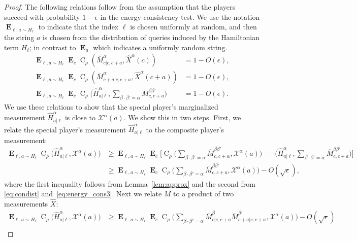 \documentclass[11pt,letterpaper]{article}
\newcommand{\<}{\langle}
\renewcommand{\>}{\rangle}
\newcommand{\myeqref}[1]{\eqref{eq:#1}}
\newcommand{\eps}{\epsilon}
\newcommand{\Xlin}{\mathcal{X}}
\DeclareMathOperator{\E}{\mathbf{E}}
\DeclareMathOperator{\CON}{C}
\DeclareMathOperator{\DIS}{d}
\DeclareMathOperator{\Drho}{\DIS_\rho}
\newcommand{\bavg}[2]{\big\langle #1 \big\rangle_{#2}}
\newcommand{\cons}{\ensuremath{\rm cons}}
\newcommand{\sx}{\hat{X}}
\renewcommand{\sp}{\hat{H}}
\begin{document}
\begin{proof}
The following relations follow from the
assumption that the players succeed with probability $1-\eps_{}$
in the energy consistency test. We use the notation $\E_{\ell, a \sim
  H_\ell}$ to indicate that the index $\ell$ is chosen uniformly at
random, and then the string $a$ is chosen from the distribution of queries induced
by the Hamiltonian term $H_\ell$; in contrast to $\E_a$ which indicates a uniformly
random string. 
	  \begin{align}
      \E_{\ell, a \sim H_\ell} \E_{c} \CON_\rho(\overline{M}_{c | c, c+a}^\alpha, \sx^\alpha(c)) &= 1 -  O(\eps_{}), \label{eq:energy_cons1}\\
      \E_{\ell, a \sim H_\ell} \E_{c} \CON_\rho(\overline{M}_{c+a | c, c+a}^\alpha, \sx^\alpha(c + a)) &= 1 -   O(\eps_{}), \label{eq:energy_cons2}\\
      \E_{\ell, a \sim H_\ell} \E_c \CON_\rho\Big(\sp_{a | \ell}^{\alpha}, \sum_{\beta \cdot \beta' =
      \alpha}M_{c, c+a}^{\beta \beta'}\Big) &= 1- O(\eps_{}) \label{eq:energy_cons3}.
  \end{align}
  We use these relations to show that the special player's
  marginalized measurement $\sp^{\alpha}_{a|\ell}$ is close to
  $\Xlin^{\alpha}(a)$. We show
  this in two steps. First, we relate the special player's measurement
  $\sp^{\alpha}_{a|\ell}$ to the composite player's measurement:
  \begin{align*}
    \E_{\ell, a \sim H_\ell} \CON_\rho\big(\sp_{a|\ell}^{\alpha}, \Xlin^{\alpha}(a) \big) 
		&\geq     \E_{\ell, a \sim H_\ell}   \E_c \Big[ \CON_\rho\Big(\sum_{\beta \cdot \beta' = \alpha} \overline{M}^{\beta \beta'}_{c, c + \alpha}, \Xlin^\alpha(a) \Big)  - \Drho \Big(\sp^\alpha_{a | \ell}, \sum_{\beta \cdot \beta' = \alpha} \overline{M}^{\beta \beta'}_{c, c+ a}\Big) \Big] \\
    &\geq \E_{\ell, a \sim H_\ell} \E_c   \CON_\rho\Big(\sum_{\beta \cdot \beta' = \alpha} \overline{M}^{\beta \beta'}_{c, c + a}, \Xlin^\alpha(a)\Big) - O(\sqrt{\eps_{}}), 
\end{align*}
where the first inequality follows from Lemma~\ref{lem:approx} and the
second from \myeqref{condist} and~\eqref{eq:energy_cons3}.  Next we relate
$M$ to a product of two measurements $\sx$:
\begin{align*}
    \E_{\ell, a \sim H_\ell} \CON_\rho\big(\sp_{a|\ell}^{\alpha},
  \Xlin^{\alpha}(a) \big)  &\geq \E_{\ell, a\sim H_\ell} \E_c \CON_\rho\Big( \sum_{\beta \cdot \beta' = \alpha} \overline{M}^{\beta}_{c| c, c+a} \overline{M}^{\beta'}_{c+a|c, c+ a}, \Xlin^\alpha(a)\Big)  - O(\sqrt{\eps_{}})\\

\end{align*}
\end{proof}
\end{document}
